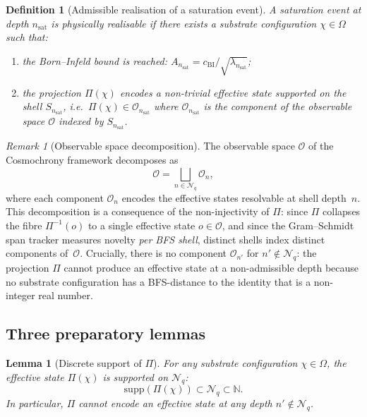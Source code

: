 \documentclass[12pt,a4paper]{article}
\newtheorem{lemma}[theorem]{Lemma}
\newtheorem{definition}[theorem]{Definition}
\theoremstyle{remark}
\newtheorem{remark}[theorem]{Remark}
\newcommand{\nsat}{n_{\mathrm{sat}}}
\begin{document}
    \begin{definition}[Admissible realisation of a saturation event]
      \label{def:admissible_realisation}
      A saturation event at depth $\nsat$ is \emph{physically realisable} if there exists a
      substrate configuration $\chi \in \Omega$ such that:
      \begin{enumerate}
        \item[(R1)] the Born--Infeld bound is reached: $A_{\nsat} = c_{\mathrm{BI}} / \sqrt{\lambda_{\nsat}}$;
        \item[(R2)] the projection $\Pi(\chi)$ encodes a non-trivial effective state supported on
        the shell $S_{\nsat}$, i.e.\ $\Pi(\chi) \in \mathcal{O}_{\nsat}$ where
        $\mathcal{O}_{\nsat}$ is the component of the observable space $\mathcal{O}$ indexed
        by $S_{\nsat}$.
      \end{enumerate}
    \end{definition}

    \begin{remark}[Observable space decomposition]
      \label{rem:observable_decomposition}
      The observable space $\mathcal{O}$ of the Cosmochrony framework decomposes as
      \begin{equation}
        \label{eq:observable_decomp}
        \mathcal{O} = \bigsqcup_{n \in \mathcal{N}_q} \mathcal{O}_n,
      \end{equation}
      where each component $\mathcal{O}_n$ encodes the effective states resolvable at shell depth~$n$.
      This decomposition is a consequence of the non-injectivity of $\Pi$: since $\Pi$ collapses
      the fibre $\Pi^{-1}(o)$ to a single effective state $o \in \mathcal{O}$, and since the
      Gram--Schmidt span tracker measures novelty \emph{per BFS shell}, distinct shells index
      distinct components of~$\mathcal{O}$.
      Crucially, there is no component $\mathcal{O}_{n'}$ for $n' \notin \mathcal{N}_q$:
      the projection $\Pi$ cannot produce an effective state at a non-admissible depth
      because no substrate configuration has a BFS-distance to the identity that is a
      non-integer real number.
    \end{remark}

  \subsection{Three preparatory lemmas}
    \label{subsec:lemmas}

    \begin{lemma}[Discrete support of $\Pi$]
      \label{lem:discrete_support}
      For any substrate configuration $\chi \in \Omega$, the effective state $\Pi(\chi)$ is
      supported on $\mathcal{N}_q$:
      \begin{equation}
        \label{eq:discrete_support}
        \mathrm{supp}(\Pi(\chi)) \subset \mathcal{N}_q \subset \mathbb{N}.
      \end{equation}
      In particular, $\Pi$ cannot encode an effective state at any depth $n' \notin \mathcal{N}_q$.
    \end{lemma}
\end{document}
